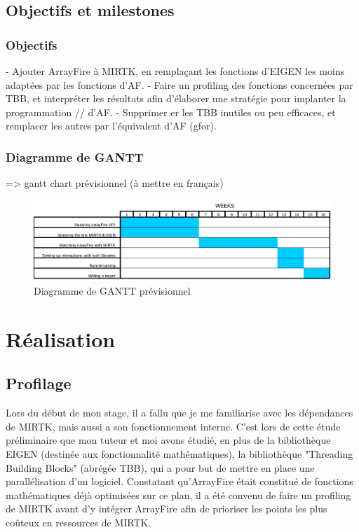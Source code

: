 \documentclass[10pt]{report}
\begin{document}
	\section{Objectifs et milestones}
	
	\subsection{Objectifs} 
	- Ajouter ArrayFire à MIRTK, en remplaçant les fonctions d'EIGEN les moins adaptées par les fonctions d'AF. \newline
	- Faire un profiling des fonctions concernées par TBB, et interpréter les résultats afin d'élaborer une stratégie pour implanter la programmation // d'AF.\newline
	- Supprimer er les TBB inutiles ou peu efficaces, et remplacer les autres par l'équivalent d'AF (gfor).\newline
	
	
	\subsection{Diagramme de GANTT}
	 => gantt chart prévisionnel (à mettre en français)
	\begin{figure}[h!]
		\begin{center}
			\includegraphics[width=18cm]{Reports/figures/estimated_gantt.png}
		\end{center}	
		\caption{Diagramme de GANTT prévisionnel}
		\label{Diagramme de GANTT prévisionnel}
	\end{figure}
\chapter{Réalisation}
	\section{Profilage}
	Lors du début de mon stage, il a fallu que je me familiarise avec les dépendances de MIRTK, mais aussi a son fonctionnement interne. C'est lors de cette étude préliminaire que mon tuteur et moi avons étudié, en plus de la bibliothèque EIGEN (destinée aux fonctionnalité mathématiques), la bibliothèque "Threading Building Blocks" (abrégée TBB), qui a pour but de mettre en place une parallélisation d'un logiciel. Constatant qu'ArrayFire était constitué de fonctions mathématiques déjà optimisées sur ce plan, il a été convenu de faire un profiling de MIRTK avant d'y intégrer ArrayFire afin de prioriser les points les plus coûteux en ressources de MIRTK. 
	
\end{document}
